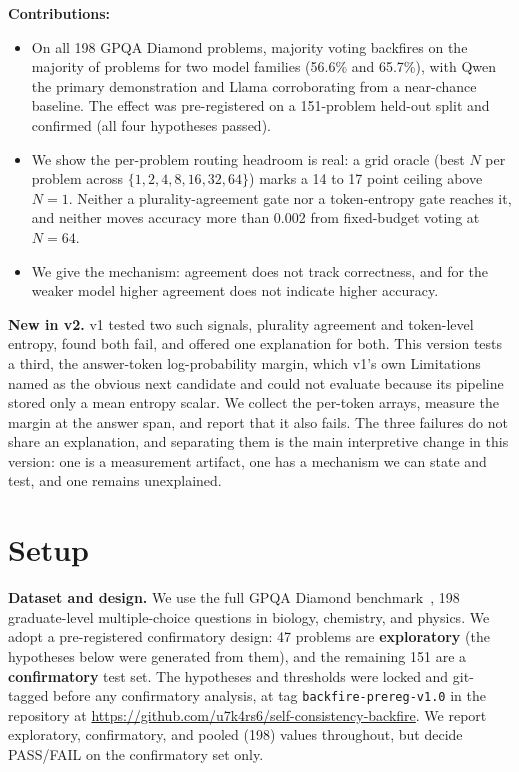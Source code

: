 \documentclass{article}
\begin{document}
\textbf{Contributions:}
\begin{itemize}
  \item On all 198 GPQA Diamond problems, majority voting backfires on the
        majority of problems for two model families (56.6\% and 65.7\%), with
        Qwen the primary demonstration and Llama corroborating from a
        near-chance baseline. The effect was pre-registered on a 151-problem
        held-out split and confirmed (all four hypotheses passed).
  \item We show the per-problem routing headroom is real: a grid oracle (best
        $N$ per problem across $\{1,2,4,8,16,32,64\}$) marks a 14 to 17 point
        ceiling above $N=1$. Neither a plurality-agreement gate nor a
        token-entropy gate reaches it, and neither moves accuracy more than
        0.002 from fixed-budget voting at $N=64$.
  \item We give the mechanism: agreement does not track correctness, and for
        the weaker model higher agreement does not indicate higher accuracy.
\end{itemize}


\textbf{New in v2.} v1 tested two such signals, plurality agreement and
token-level entropy, found both fail, and offered one explanation for both.
This version tests a third, the answer-token log-probability margin, which
v1's own Limitations named as the obvious next candidate and could not
evaluate because its pipeline stored only a mean entropy scalar. We collect
the per-token arrays, measure the margin at the answer span, and report that it
also fails. The three failures do not share an explanation, and separating them
is the main interpretive change in this version: one is a measurement artifact,
one has a mechanism we can state and test, and one remains unexplained.

\section{Setup}

\textbf{Dataset and design.} We use the full GPQA Diamond
benchmark~\citep{rein2023gpqa}, 198 graduate-level multiple-choice questions
in biology, chemistry, and physics. We adopt a pre-registered confirmatory
design: 47 problems are \textbf{exploratory} (the hypotheses below were
generated from them), and the remaining 151 are a \textbf{confirmatory} test
set. The hypotheses and thresholds were locked and git-tagged before any
confirmatory analysis, at tag \texttt{backfire-prereg-v1.0} in the repository
at \url{https://github.com/u7k4rs6/self-consistency-backfire}. We report
exploratory, confirmatory, and pooled (198) values throughout, but decide
PASS/FAIL on the confirmatory set only.
\end{document}
